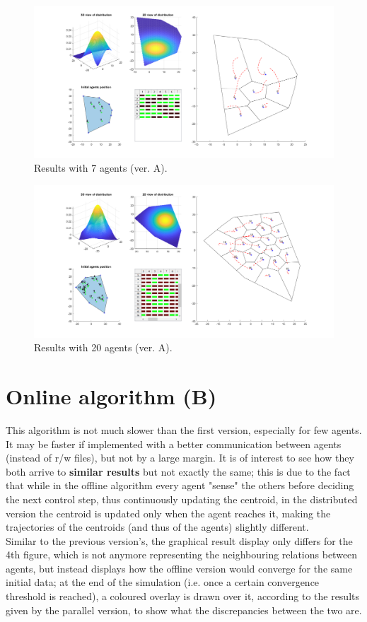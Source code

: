 \documentclass[a4paper,11pt,oneside]{book}
\begin{document}
	
	\begin{figure}	
		\centering	
		\includegraphics[scale=0.45,angle=90]{figs/convergenceResultsA.png}
		\caption{Results with 7 agents (ver. A).}\label{fig:convergenceResultsA.png}	
	\end{figure}
	
	\begin{figure}	
		\centering	
		\includegraphics[scale=0.45, angle=90]{figs/20convergenceResultsA.png}
		\caption{Results with 20 agents (ver. A).}\label{fig:20convergenceResultsA.png}	
	\end{figure}
	
	\newpage 
	\section{Online algorithm (B)}
	This algorithm is not much slower than the first version, especially for few agents.
	It may be faster if implemented with a better communication between agents (instead of r/w files), but not by a large margin.
	It is of interest to see how they both arrive to \textbf{similar results} but not exactly the same; this is due to the fact that while in the offline algorithm every agent "sense" the others before deciding the next control step, thus continuously updating the centroid, in the distributed version the centroid is updated only when the agent reaches it, making the trajectories of the centroids (and thus of the agents) slightly different.
	\\
	Similar to the previous version's, the graphical result display only differs for the 4th figure, which is not anymore representing the neighbouring relations between agents, but instead displays how the offline version would converge for the same initial data; at the end of the simulation (i.e. once a certain convergence threshold is reached), a coloured overlay is drawn over it, according to the results given by the parallel version, to show what the discrepancies between the two are.
	
\end{document}
